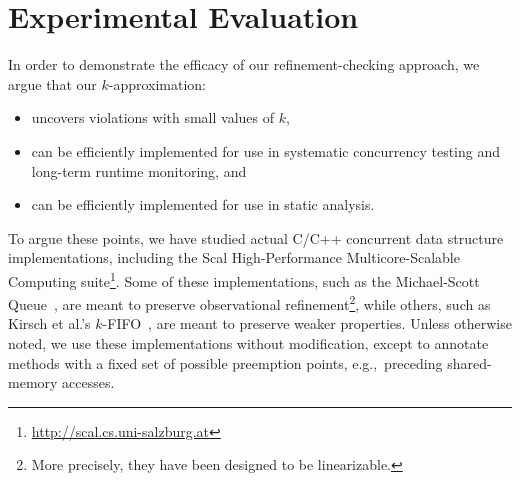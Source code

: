 \section{Experimental Evaluation}
\label{sec:exp}

In order to demonstrate the efficacy of our refinement-checking approach, we
argue that our $k$-approximation:
\begin{itemize}

  \item uncovers violations with small values of $k$,

  \item can be efficiently implemented for use in systematic concurrency
  testing and long-term runtime monitoring, and
  
  \item can be efficiently implemented for use in static analysis.

\end{itemize}

To argue these points, we have studied actual C/C++ concurrent data structure
implementations, including the Scal High-Performance Multicore-Scalable
Computing suite\footnote{\url{http://scal.cs.uni-salzburg.at}}. Some of these
implementations, such as the Michael-Scott Queue~\cite{conf/podc/MichaelS96},
are meant to preserve observational refinement\footnote{More precisely, they
have been designed to be linearizable.}, while others, such as Kirsch et al.'s
$k$-FIFO~\cite{conf/pact/KirschLP13}, are meant to preserve weaker properties.
Unless otherwise noted, we use these implementations without modification,
except to annotate methods with a fixed set of possible preemption points,
e.g.,~preceding shared-memory accesses.

